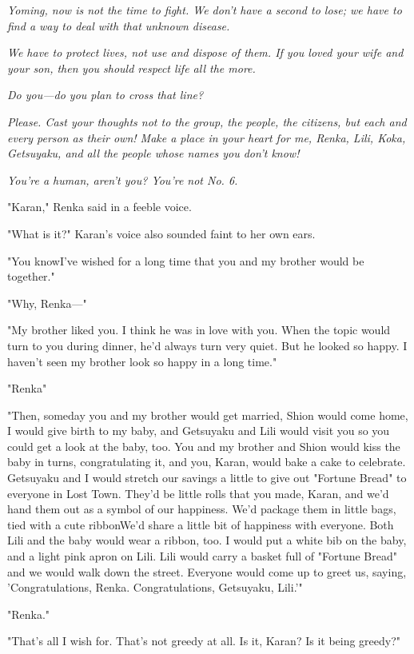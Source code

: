 \emph{Yoming, now is not the time to fight. We don't have a second to lose; we
have to find a way to deal with that unknown disease.}

\emph{We have to protect lives, not use and dispose of them. If you loved your
wife and your son, then you should respect life all the more.}

\emph{Do you---do you plan to cross that line?}

\emph{Please. Cast your thoughts not to the group, the people, the citizens,
but each and every person as their own! Make a place in your heart for
me, Renka, Lili, Koka, Getsuyaku, and all the people whose names you
don't know!}

\emph{You're a human, aren't you? You're not No. 6.}

"Karan," Renka said in a feeble voice.

"What is it?" Karan's voice also sounded faint to her own ears.

"You know\el I've wished for a long time that you and my brother would
be together."

"Why, Renka---"

"My brother liked you. I think he was in love with you. When the topic
would turn to you during dinner, he'd always turn very quiet. But he
looked so happy. I haven't seen my brother look so happy in a long
time."

"Renka\el "

"Then, someday you and my brother would get married, Shion would come
home, I would give birth to my baby, and Getsuyaku and Lili would visit
you so you could get a look at the baby, too. You and my brother and
Shion would kiss the baby in turns, congratulating it, and you, Karan,
would bake a cake to celebrate. Getsuyaku and I would stretch our
savings a little to give out "Fortune Bread" to everyone in Lost Town.
They'd be little rolls that you made, Karan, and we'd hand them out as a
symbol of our happiness. We'd package them in little bags, tied with a
cute ribbon\el We'd share a little bit of happiness with everyone. Both
Lili and the baby would wear a ribbon, too. I would put a white bib on
the baby, and a light pink apron on Lili. Lili would carry a basket full
of "Fortune Bread" and we would walk down the street. Everyone would
come up to greet us, saying, 'Congratulations, Renka. Congratulations,
Getsuyaku, Lili.'"

"Renka."

"That's all I wish for. That's not greedy at all. Is it, Karan? Is it
being greedy?"

